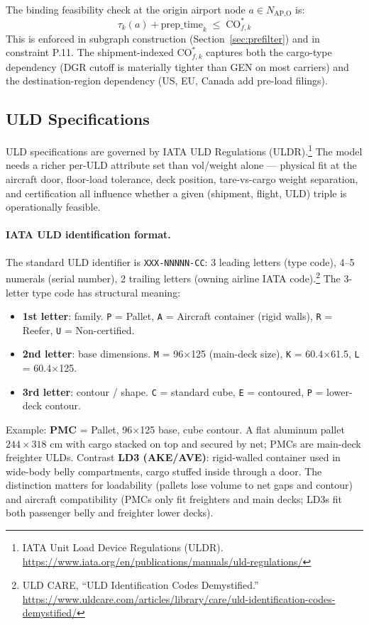 \documentclass[11pt,a4paper]{article}
\theoremstyle{definition}
\begin{document}
The binding feasibility check at the origin airport node \(a \in N_{\text{AP,O}}\) is:
\begin{equation}
  \tau_k(a) + \text{prep\_time}_k \;\leq\; \text{CO}_{f,k}^*
  \label{eq:cutoff-feasibility}
\end{equation}
This is enforced in subgraph construction (Section~\ref{sec:prefilter}) and in
constraint P.11. The shipment-indexed $\text{CO}_{f,k}^*$ captures both the cargo-type
dependency (DGR cutoff is materially tighter than GEN on most carriers) and the
destination-region dependency (US, EU, Canada add pre-load filings).

\subsection{ULD Specifications}
\label{sec:uld-spec}

ULD specifications are governed by IATA ULD Regulations (ULDR).\footnote{IATA Unit Load
Device Regulations (ULDR). \url{https://www.iata.org/en/publications/manuals/uld-regulations/}}
The model needs a richer per-ULD attribute set than vol/weight alone — physical fit at
the aircraft door, floor-load tolerance, deck position, tare-vs-cargo weight separation,
and certification all influence whether a given (shipment, flight, ULD) triple is
operationally feasible.

\paragraph{IATA ULD identification format.}
The standard ULD identifier is \texttt{XXX-NNNNN-CC}: 3 leading letters (type code),
4--5 numerals (serial number), 2 trailing letters (owning airline IATA code).\footnote{ULD CARE,
``ULD Identification Codes Demystified.''
\url{https://www.uldcare.com/articles/library/care/uld-identification-codes-demystified/}}
The 3-letter type code has structural meaning:
\begin{itemize}[noitemsep]
  \item \textbf{1st letter}: family. \texttt{P} = Pallet, \texttt{A} = Aircraft container
        (rigid walls), \texttt{R} = Reefer, \texttt{U} = Non-certified.
  \item \textbf{2nd letter}: base dimensions. \texttt{M} = 96\textquotedbl{}\(\times\)125\textquotedbl{}
        (main-deck size), \texttt{K} = 60.4\textquotedbl{}\(\times\)61.5\textquotedbl{},
        \texttt{L} = 60.4\textquotedbl{}\(\times\)125\textquotedbl{}.
  \item \textbf{3rd letter}: contour / shape. \texttt{C} = standard cube,
        \texttt{E} = contoured, \texttt{P} = lower-deck contour.
\end{itemize}
Example: \textbf{PMC} = Pallet, 96\textquotedbl{}\(\times\)125\textquotedbl{} base, cube
contour. A flat aluminum pallet $244 \times 318$ cm with cargo stacked on top and
secured by net; PMCs are main-deck freighter ULDs. Contrast \textbf{LD3 (AKE/AVE)}:
rigid-walled container used in wide-body belly compartments, cargo stuffed inside
through a door. The distinction matters for loadability (pallets lose volume to net
gaps and contour) and aircraft compatibility (PMCs only fit freighters and main decks;
LD3s fit both passenger belly and freighter lower decks).
\end{document}
